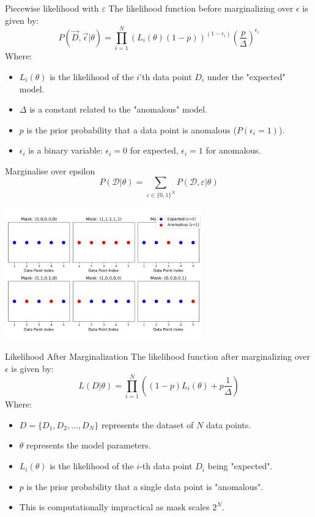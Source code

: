 \documentclass[aspectratio=169]{beamer}
\begin{document}
\begin{frame}{Piecewise likelihood with $\varepsilon$}
    \centering
    The likelihood function before marginalizing over $\epsilon$ is given by:
    $$P(\vec{D}, \vec{\epsilon} | \theta) = \prod_{i=1}^{N} \left(L_i(\theta) (1-p)\right)^{(1-\epsilon_i)} \left(\frac{p}{\Delta}\right)^{\epsilon_i}$$
    Where:
    \begin{itemize}
        \item $L_i(\theta)$ is the likelihood of the $i$'th data point $D_i$ under the "expected" model.
        \item $\Delta$ is a constant related to the "anomalous" model.
        \item $p$ is the prior probability that a data point is anomalous ($P(\epsilon_i = 1)$).
        \item $\epsilon_i$ is a binary variable: $\epsilon_i = 0$ for expected, $\epsilon_i = 1$ for anomalous.
    \end{itemize}
\end{frame}

\begin{frame}{Marginalise over epsilon}
  \footnotesize
  \begin{equation}
      P(\mathcal{D} | \theta) =\sum_{\varepsilon \in \{ 0, 1 \} ^N}P(\mathcal{D},\varepsilon|\theta)
  \end{equation}
  \begin{center}
    \includegraphics[width=0.64\textwidth]{images/marginalize_epsilon_plot.png}
  \end{center}
\end{frame}
\begin{frame}{Likelihood After Marginalization}
    \centering
    The likelihood function after marginalizing over $\epsilon$ is given by:
    $$L(D | \theta) = \prod_{i=1}^{N} \left( (1-p) L_i(\theta) + p \frac{1}{\Delta} \right)$$
    Where:
    \begin{itemize}
        \item $D = \{D_1, D_2, \dots, D_N\}$ represents the dataset of $N$ data points.
        \item $\theta$ represents the model parameters.
        \item $L_i(\theta)$ is the likelihood of the $i$-th data point $D_i$ being "expected".
        \item $p$ is the prior probability that a single data point is "anomalous".
        \item This is computationally impractical as mask scales $2^N$.
    \end{itemize}
\end{frame}
\end{document}
